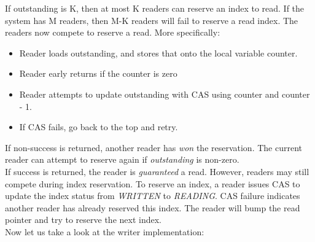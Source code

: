 If outstanding is K, then at most K readers can reserve an index to read. If the system 
has M readers, then M-K readers will fail to reserve a read index. The readers now 
compete to reserve a read. More specifically: 
\begin{itemize}
    \item Reader loads outstanding, and stores that onto the local variable counter.
    \item Reader early returns if the counter is zero 
    \item Reader attempts to update outstanding with CAS using counter and counter - 1.
    \item If CAS fails, go back to the top and retry.
\end{itemize}

If non-success is returned, another reader has \textit{won} the reservation. The
current reader can attempt to reserve again if \textit{outstanding} is
non-zero.\\

If success is returned, the reader is \textit{guaranteed} a read. However,
readers may still compete during index reservation. To reserve an index, a
reader issues CAS to update the index status from \textit{WRITTEN} to
\textit{READING}. CAS failure indicates another reader has already reserved this
index. The reader will bump the read pointer and try to reserve the next
index.\\

Now let us take a look at the writer implementation:\\


